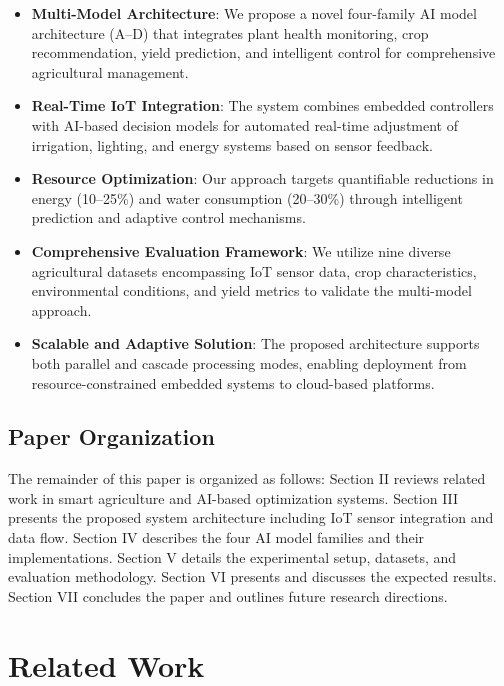\documentclass[conference]{IEEEtran}
\begin{document}
\begin{itemize}
\item \textbf{Multi-Model Architecture}: We propose a novel four-family AI model architecture (A--D) that integrates plant health monitoring, crop recommendation, yield prediction, and intelligent control for comprehensive agricultural management.

\item \textbf{Real-Time IoT Integration}: The system combines embedded controllers with AI-based decision models for automated real-time adjustment of irrigation, lighting, and energy systems based on sensor feedback.

\item \textbf{Resource Optimization}: Our approach targets quantifiable reductions in energy (10--25\%) and water consumption (20--30\%) through intelligent prediction and adaptive control mechanisms.

\item \textbf{Comprehensive Evaluation Framework}: We utilize nine diverse agricultural datasets encompassing IoT sensor data, crop characteristics, environmental conditions, and yield metrics to validate the multi-model approach.

\item \textbf{Scalable and Adaptive Solution}: The proposed architecture supports both parallel and cascade processing modes, enabling deployment from resource-constrained embedded systems to cloud-based platforms.
\end{itemize}

\subsection{Paper Organization}

The remainder of this paper is organized as follows: Section II reviews related work in smart agriculture and AI-based optimization systems. Section III presents the proposed system architecture including IoT sensor integration and data flow. Section IV describes the four AI model families and their implementations. Section V details the experimental setup, datasets, and evaluation methodology. Section VI presents and discusses the expected results. Section VII concludes the paper and outlines future research directions.

\section{Related Work}
\end{document}
